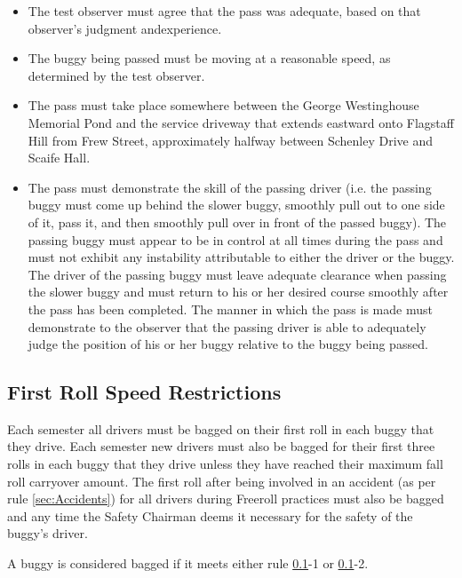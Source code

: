 	\begin{itemize}

		\item The test observer must agree that the pass was adequate, based on that observer's judgment andexperience.

		\item The buggy being passed must be moving at a reasonable speed, as determined by the test observer.

		\item The pass must take place somewhere between the George Westinghouse Memorial Pond and the service driveway that extends eastward onto Flagstaff Hill from Frew Street, approximately halfway between Schenley Drive and Scaife Hall.

		\item The pass must demonstrate the skill of the passing driver (i.e. the passing buggy must come up behind the slower buggy, smoothly pull out to one side of it, pass it, and then smoothly pull over in front of the passed buggy). The passing buggy must appear to be in control at all times during the pass and must not exhibit any instability attributable to either the driver or the buggy. The driver of the passing buggy must leave adequate clearance when passing the slower buggy and must return to his or her desired course smoothly after the pass has been completed. The manner in which the pass is made must demonstrate to the observer that the passing driver is able to adequately judge the position of his or her buggy relative to the buggy being passed.

	\end{itemize}

\subsection{First Roll Speed Restrictions}
\label{sec:FirstRollSpeedRestrictions}

	Each semester all drivers must be bagged on their first roll in each buggy that they drive. Each semester new drivers must also be bagged for their first three rolls in each buggy that they drive unless they have reached their maximum fall roll carryover amount. The first roll after being involved in an accident (as per rule \ref{sec:Accidents}) for all drivers during Freeroll practices must also be bagged and any time the Safety Chairman deems it necessary for the safety of the buggy's driver.

	A buggy is considered bagged if it meets either rule
	\ref{sec:FirstRollSpeedRestrictions}-1 or \ref{sec:FirstRollSpeedRestrictions}-2.

